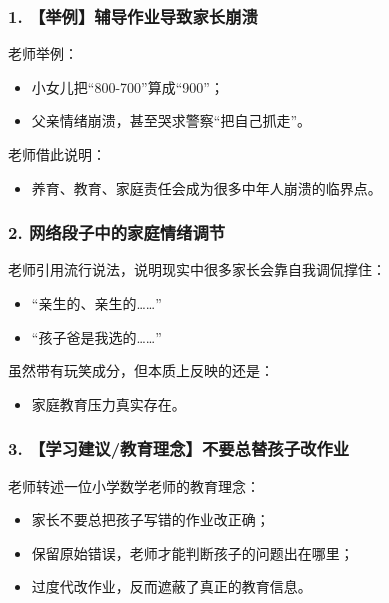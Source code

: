 \documentclass[
  chinese,
  9pt,
  a4paper,
]{ctexart}
\providecommand{\tightlist}{%
  \setlength{\itemsep}{0pt}\setlength{\parskip}{0pt}}
\begin{document}
\subsubsection{1.
【举例】辅导作业导致家长崩溃}\label{ux4e3eux4f8bux8f85ux5bfcux4f5cux4e1aux5bfcux81f4ux5bb6ux957fux5d29ux6e83}

老师举例：

\begin{itemize}
\tightlist
\item
  小女儿把``800-700''算成``900''；
\item
  父亲情绪崩溃，甚至哭求警察``把自己抓走''。
\end{itemize}

老师借此说明：

\begin{itemize}
\tightlist
\item
  养育、教育、家庭责任会成为很多中年人崩溃的临界点。
\end{itemize}

\subsubsection{2.
网络段子中的家庭情绪调节}\label{ux7f51ux7edcux6bb5ux5b50ux4e2dux7684ux5bb6ux5eadux60c5ux7eeaux8c03ux8282}

老师引用流行说法，说明现实中很多家长会靠自我调侃撑住：

\begin{itemize}
\tightlist
\item
  ``亲生的、亲生的\ldots\ldots{}''
\item
  ``孩子爸是我选的\ldots\ldots{}''
\end{itemize}

虽然带有玩笑成分，但本质上反映的还是：

\begin{itemize}
\tightlist
\item
  家庭教育压力真实存在。
\end{itemize}

\subsubsection{3.
【学习建议/教育理念】不要总替孩子改作业}\label{ux5b66ux4e60ux5efaux8baeux6559ux80b2ux7406ux5ff5ux4e0dux8981ux603bux66ffux5b69ux5b50ux6539ux4f5cux4e1a}

老师转述一位小学数学老师的教育理念：

\begin{itemize}
\tightlist
\item
  家长不要总把孩子写错的作业改正确；
\item
  保留原始错误，老师才能判断孩子的问题出在哪里；
\item
  过度代改作业，反而遮蔽了真正的教育信息。
\end{itemize}
\end{document}
